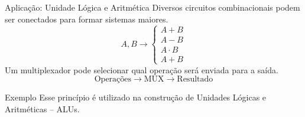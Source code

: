 \begin{frame}{Aplicação: Unidade Lógica e Aritmética}
    Diversos circuitos combinacionais podem ser conectados
    para formar sistemas maiores.
    \[
        A,B
        \longrightarrow
        \begin{cases}
            A+B \\
            A-B \\
            A\cdot B \\
            A+B
        \end{cases}
    \]
    Um multiplexador pode selecionar qual operação será
    enviada para a saída.
    \[
        \boxed{\text{Operações}}
        \longrightarrow
        \boxed{\text{MUX}}
        \longrightarrow
        \boxed{\text{Resultado}}
    \]

    \begin{block}{Exemplo}
        Esse princípio é utilizado na construção de
        Unidades Lógicas e Aritméticas -- ALUs.
    \end{block}

\end{frame}